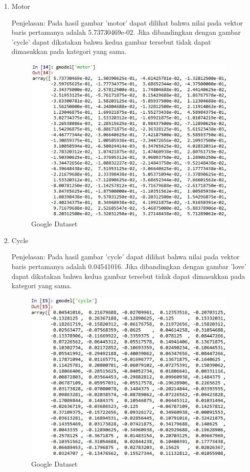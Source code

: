 \begin{enumerate}
\begin{enumerate}
\item Motor

Penjelasan: Pada hasil gambar 'motor' dapat dilihat bahwa nilai pada vektor baris pertamanya adalah 5.73730469e-02. Jika dibandingkan dengan gambar 'cycle' dapat dikatakan bahwa kedua gambar tersebut tidak dapat dimasukkan pada kategori yang sama.

\begin{figure}[H]
\centering
\includegraphics[scale=0.7]{figures/1174051/5/21motor.jpg}
\caption{Google Dataset}
\label{Google Dataset}
\end{figure}

\item Cycle

Penjelasan: Pada hasil gambar 'cycle' dapat dilihat bahwa nilai pada vektor baris pertamanya adalah 0.04541016. Jika dibandingkan dengan gambar 'love' dapat dikatakan bahwa kedua gambar tersebut tidak dapat dimasukkan pada kategori yang sama.

\begin{figure}[H]
\centering
\includegraphics[scale=0.7]{figures/1174051/5/22cycle.jpg}
\caption{Google Dataset}
\label{Google Dataset}
\end{figure}


\end{enumerate}
\end{enumerate}
